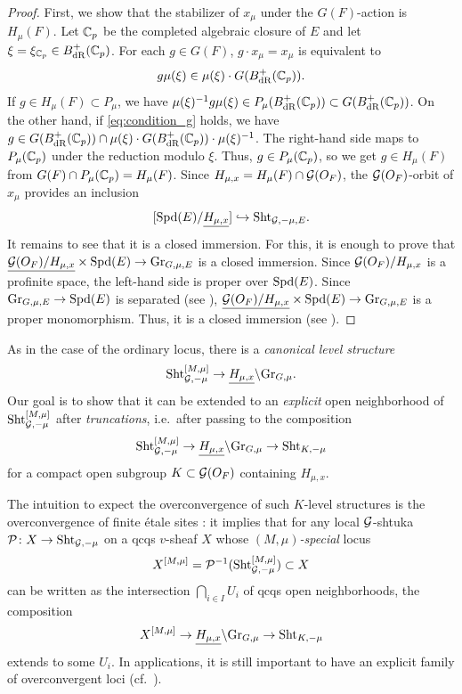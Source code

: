 \documentclass[12pt,reqno]{amsart}
\begin{document}
\begin{proof}
    First, we show that the stabilizer of $x_\mu$ under the $G(F)$-action is $H_\mu(F)$. Let $\mathbb{C}_p$ be the completed algebraic closure of $E$ and let $\xi = \xi_{\mathbb{C}_p} \in B^+_{\operatorname{dR}}(\mathbb{C}_p)$. For each $g \in G(F)$, $g \cdot x_\mu = x_\mu$ is equivalent to 
    \begin{equation} \label{eq:condition_g}
        g \mu(\xi) \in \mu(\xi) \cdot G(B^+_{\operatorname{dR}}(\mathbb{C}_p)). 
    \end{equation}
    If $g \in H_\mu(F) \subset P_\mu$, we have $\mu(\xi)^{-1} g \mu(\xi) \in P_\mu(B^+_{\operatorname{dR}}(\mathbb{C}_p)) \subset G(B^+_{\operatorname{dR}}(\mathbb{C}_p))$. On the other hand, if \eqref{eq:condition_g} holds, we have $g \in G(B^+_{\operatorname{dR}}(\mathbb{C}_p)) \cap \mu(\xi) \cdot G(B^+_{\operatorname{dR}}(\mathbb{C}_p)) \cdot \mu(\xi)^{-1}$. The right-hand side maps to $P_\mu(\mathbb{C}_p)$ under the reduction modulo $\xi$. Thus, $g \in P_\mu(\mathbb{C}_p)$, so we get $g \in H_\mu(F)$ from $G(F) \cap P_\mu(\mathbb{C}_p) = H_\mu(F)$. Since $H_{\mu, x} = H_\mu(F) \cap {\mathcal{G}}(O_F) $, the ${\mathcal{G}}(O_F)$-orbit of $x_\mu$ provides an inclusion 
    \[
        [{\operatorname{Spd}}(E) / {\underline{H_{\mu, x}}}] \hookrightarrow  {\operatorname{Sht}}_{{\mathcal{G}}, -\mu, E}. 
    \]
    It remains to see that it is a closed immersion. For this, it is enough to prove that ${\underline{{\mathcal{G}}(O_F) / H_{\mu, x}}} \times {\operatorname{Spd}}(E) \to {\operatorname{Gr}}_{G, \mu, E}$ is a closed immersion. Since ${\mathcal{G}}(O_F) / H_{\mu, x}$ is a profinite space, the left-hand side is proper over ${\operatorname{Spd}}(E)$. Since ${\operatorname{Gr}}_{G, \mu, E} \to {\operatorname{Spd}}(E)$ is separated (see \cite[Proposition 20.2.3]{SW20}), ${\underline{{\mathcal{G}}(O_F) / H_{\mu, x}}} \times {\operatorname{Spd}}(E) \to {\operatorname{Gr}}_{G, \mu, E}$ is a proper monomorphism. Thus, it is a closed immersion (see \cite[Lemma 2.1]{AGLR22}).  
\end{proof}

As in the case of the ordinary locus, there is a \textit{canonical level structure}
\[
    {\operatorname{Sht}}_{{\mathcal{G}}, -\mu}^{[M, \mu]} \to {\underline{H_{\mu, x}}} \backslash {\operatorname{Gr}}_{G, \mu}. 
\]
Our goal is to show that it can be extended to an \textit{explicit} open neighborhood of ${\operatorname{Sht}}_{{\mathcal{G}}, -\mu}^{[M, \mu]}$ after \textit{truncations}, i.e.\ after passing to the composition  
\[
    {\operatorname{Sht}}_{{\mathcal{G}}, -\mu}^{[M, \mu]} \to {\underline{H_{\mu, x}}} \backslash {\operatorname{Gr}}_{G, \mu} \to {\operatorname{Sht}}_{K, -\mu}
\]
for a compact open subgroup $K \subset {\mathcal{G}}(O_F)$ containing $H_{\mu, x}$. 

\begin{rmk} \label{rmk:overconvergence_formal}
    The intuition to expect the overconvergence of such $K$-level structures is the overconvergence of finite \'{e}tale sites \cite[Lemma 12.17]{Sch17}: it implies that for any local ${\mathcal{G}}$-shtuka ${\mathcal{P}} \colon X \to {\operatorname{Sht}}_{{\mathcal{G}}, -\mu}$ on a qcqs $v$-sheaf $X$ whose \textit{$(M, \mu)$-special} locus 
    \[
        X^{[M, \mu]} = {\mathcal{P}}^{-1}({\operatorname{Sht}}_{{\mathcal{G}}, -\mu}^{[M, \mu]}) \subset X
    \]
    can be written as the intersection $\bigcap_{i \in I} U_i$ of qcqs open neighborhoods, the composition
    \[
        X^{[M, \mu]} \to {\underline{H_{\mu, x}}} \backslash {\operatorname{Gr}}_{G, \mu} \to {\operatorname{Sht}}_{K, -\mu}
    \]
    extends to some $U_i$. In applications, it is still important to have an explicit family of overconvergent loci (cf.\ ). 
\end{rmk}
\end{document}

